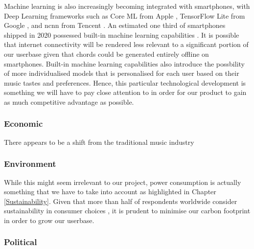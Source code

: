   Machine learning is also increasingly becoming integrated with smartphones, with Deep Learning frameworks such as Core ML from Apple \cite{applecoreml}, TensorFlow Lite from Google \cite{tensorflow}, and ncnn from Tencent \cite{tencent}. An estimated one third of smartphones shipped in 2020 possessed built-in machine learning capabilities \cite{counterpointML}. It is possible that internet connectivity will be rendered less relevant to a significant portion of our userbase given that chords could be generated entirely offline on smartphones. Built-in machine learning capabilities also introduce the possbility of more individualised models that is personalised for each user based on their music tastes and preferences. Hence, this particular technological development is something we will have to pay close attention to in order for our product to gain as much competitive advantage as possible.

  \subsubsection{Economic}
There appears to be a shift from the traditional music industry 

\subsubsection{Environment}
While this might seem irrelevant to our project, power consumption is actually something that we have to take into account as highlighted in Chapter \ref{Sustainability}. Given that more than half of respondents worldwide consider sustainability in consumer choices \cite{GlobalSurvey}, it is prudent to minimise our carbon footprint in order to grow our userbase.

\subsubsection{Political}


